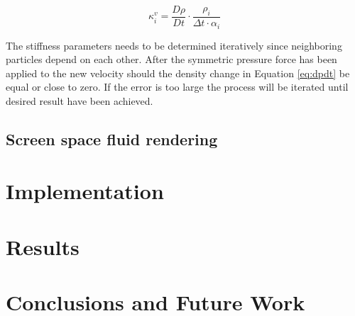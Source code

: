     \begin{equation}\label{eq:kappaDivergence}
        \kappa_i^v = \frac{D\rho}{Dt} \cdot \frac{\rho_i}{\Delta t \cdot \alpha_i}
    \end{equation}

    The stiffness parameters needs to be determined iteratively since neighboring particles depend on each other. After the symmetric pressure force has been applied to the new velocity should the density change in Equation \ref{eq:dpdt} be equal or close to zero. If the error is too large the process will be iterated until desired result have been achieved.


\subsection{Screen space fluid rendering}

\section{Implementation}
 

\section{Results}



\section{Conclusions and Future Work}






